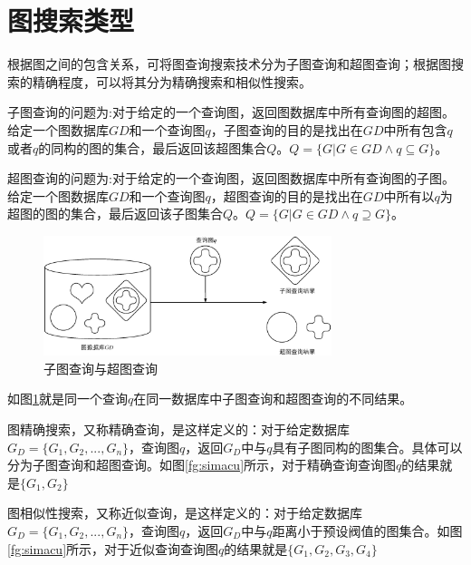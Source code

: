 \documentclass{XDBAthesis}
\begin{document}
\section{图搜索类型}
根据图之间的包含关系，可将图查询搜索技术分为子图查询和超图查询；根据图搜索的精确程度，可以将其分为精确搜索和相似性搜索\cite{g13}。
\begin{defn}[子图查询]\cite{FSD}
子图查询的问题为:对于给定的一个查询图，返回图数据库中所有查询图的超图。给定一个图数据库$GD$和一个查询图$q$，子图查询的目的是找出在$GD$中所有包含$q$或者$q$的同构的图的集合，最后返回该超图集合$Q$。$Q=\{G|G\in GD\wedge q\subseteq G\}$。
\end{defn}
\begin{defn}[超图查询]\cite{ssosc}
超图查询的问题为:对于给定的一个查询图，返回图数据库中所有查询图的子图。给定一个图数据库$GD$和一个查询图$q$，超图查询的目的是找出在$GD$中所有以$q$为超图的图的集合，最后返回该子图集合$Q$。$Q=\{G|G\in GD\wedge q\supseteq G\}$。    
\end{defn}

\begin{figure}[htb]
    \centering
    \includegraphics[width=0.75\textwidth]{Database.eps}
    \caption{子图查询与超图查询}
    \label{fg:subsup}
\end{figure}

如图\ref{fg:subsup}就是同一个查询$q$在同一数据库中子图查询和超图查询的不同结果。



\begin{defn}[精确搜索]\cite{gIndex}
图精确搜索，又称精确查询，是这样定义的：对于给定数据库$G_D =\{G_1 ,G_2 ,...,G_n \}$，查询图$q$，返回$G_D $中与$q$具有子图同构的图集合。具体可以分为子图查询和超图查询。如图\ref{fg:simacu}所示，对于精确查询查询图$q$的结果就是$\{G_1 ,G_2  \}$
\end{defn}


\begin{defn}[相似性搜索]\cite{gghash}
图相似性搜索，又称近似查询，是这样定义的：对于给定数据库$G_D =\{G_1 ,G_2 ,...,G_n \}$，查询图$q$，返回$G_D $中与$q$距离小于预设阀值的图集合。如图\ref{fg:simacu}所示，对于近似查询查询图$q$的结果就是$\{G_1 ,G_2 ,G_3 ,G_4 \} $
\end{defn}
\end{document}
